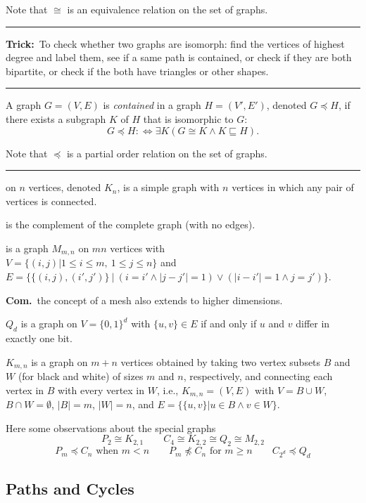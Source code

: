 \documentclass[a4paper]{extarticle}
\newcommand{\Com}{\textbf{Com.}\ }
\newcommand{\Trick}{\textbf{Trick:}\ }
\newcommand{\abs}[1]{\lvert #1 \rvert}
\newcommand{\sep}{\vspace{5pt}\noindent\hrule\vspace{5pt}}
\begin{document}
\begin{multicols*}{2}
Note that $\cong$ is an equivalence relation on the set of graphs.

\sep

\Trick To check whether two graphs are isomorph: find the vertices of highest
degree and label them, see if a same path is contained, or check if they are
both bipartite, or check if the both have triangles or other shapes.

\sep

\Def[Contained] A graph $G=(V,E)$ is \emph{contained} in a graph $H=(V',E')$,
denoted $G \preceq H$, if there exists a subgraph $K$ of $H$ that is
isomorphic to $G$:
\[
G\preceq H :\Longleftrightarrow \exists K (G\cong K \land K \sqsubseteq H).
\]

Note that $\preceq$ is a partial order relation on the set of graphs.

\sep

 on $n$ vertices, denoted $K_n$, is a simple graph with $n$
vertices in which any pair of vertices is connected.

 is the complement of the complete graph (with no edges).

\Def[$(m,n)$-Mesh] is a graph $M_{m,n}$ on $mn$ vertices with
\\
$V=\{(i,j)|1\leq i\leq m, \ 1\leq j\leq n\}$ and 
\\
$E=\{\{(i,j),(i',j')\} \ | \
(i=i'\land \abs{j-j'}=1) \lor (\abs{i-i'}=1\land j=j')\}$.

\Com the concept of a mesh also extends to higher dimensions.

 $Q_d$ is a graph on $V=\{0,1\}^d$
with $\{u,v\}\in E$ if and only if $u$ and $v$ differ in exactly one bit. 

 $K_{m,n}$ is a graph on $m+n$
vertices obtained by taking two vertex subsets $B$ and $W$ (for black and
white) of sizes $m$ and $n$, respectively, and connecting each vertex in $B$
with every vertex in $W$, i.e., $K_{m,n}=(V,E)$ with $V=B \cup W$, $B\cap W =
\emptyset$, $|B|=m$, $|W|=n$, and $E=\{\{u,v\}|u\in B \land v \in W\}$. 

\Lem Here some observations about the special graphs
\[
P_2 \cong K_{2,1} \qquad C_4\cong K_{2,2}\cong Q_2 \cong M_{2,2}
\]
\[
P_m\preceq C_n \text{ when }m<n \qquad P_m\not\preceq C_n \text{ for }m\geq n
\qquad C_{2^d}\preceq Q_d
\]

\subsection{Paths and Cycles}


\end{multicols*}
\end{document}
